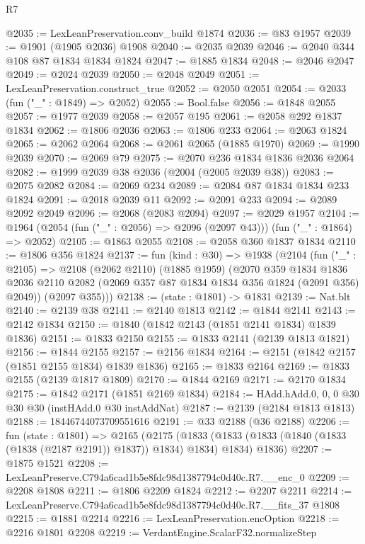 \begin{lexlean}{R7}
\begin{coremodule}
@2035 := LexLeanPreservation.conv_build @1874
@2036 := @83 @1957
@2039 := @1901 (@1905 @2036) @1908
@2040 := @2035 @2039
@2046 := @2040 @344 @108 @87 @1834 @1834 @1824
@2047 := @1885 @1834
@2048 := @2046 @2047
@2049 := @2024 @2039
@2050 := @2048 @2049
@2051 := LexLeanPreservation.construct_true
@2052 := @2050 @2051
@2054 := @2033 (fun ("_" : @1849) => @2052)
@2055 := Bool.false
@2056 := @1848 @2055
@2057 := @1977 @2039
@2058 := @2057 @195
@2061 := @2058 @292 @1837 @1834
@2062 := @1806 @2036
@2063 := @1806 @233
@2064 := @2063 @1824
@2065 := @2062 @2064
@2068 := @2061 @2065 (@1885 @1970)
@2069 := @1990 @2039
@2070 := @2069 @79
@2075 := @2070 @236 @1834 @1836 @2036 @2064
@2082 := @1999 @2039 @38 @2036 (@2004 (@2005 @2039 @38))
@2083 := @2075 @2082
@2084 := @2069 @234
@2089 := @2084 @87 @1834 @1834 @233 @1824
@2091 := @2018 @2039 @11
@2092 := @2091 @233
@2094 := @2089 @2092 @2049
@2096 := @2068 (@2083 @2094)
@2097 := @2029 @1957
@2104 := @1964 (@2054 (fun ("_" : @2056) => @2096 (@2097 @43))) (fun ("_" : @1864) => @2052)
@2105 := @1863 @2055
@2108 := @2058 @360 @1837 @1834
@2110 := @1806 @356 @1824
@2137 := fun (kind : @30) =>
  @1938
    (@2104
      (fun ("_" : @2105) =>
      @2108
        (@2062 @2110)
        (@1885 @1959)
        (@2070
          @359
          @1834
          @1836
          @2036
          @2110
          @2082
          (@2069 @357 @87 @1834 @1834 @356 @1824 (@2091 @356) @2049))
        (@2097 @355)))
@2138 := (state : @1801) -> @1831
@2139 := Nat.blt
@2140 := @2139 @38
@2141 := @2140 @1813
@2142 := @1844 @2141
@2143 := @2142 @1834
@2150 := @1840 (@1842 @2143 (@1851 @2141 @1834) @1839 @1836)
@2151 := @1833 @2150
@2155 := @1833 @2141 (@2139 @1813 @1821)
@2156 := @1844 @2155
@2157 := @2156 @1834
@2164 := @2151 (@1842 @2157 (@1851 @2155 @1834) @1839 @1836)
@2165 := @1833 @2164
@2169 := @1833 @2155 (@2139 @1817 @1809)
@2170 := @1844 @2169
@2171 := @2170 @1834
@2175 := @1842 @2171 (@1851 @2169 @1834)
@2184 := HAdd.hAdd.{0, 0, 0} @30 @30 @30 (instHAdd.{0} @30 instAddNat)
@2187 := @2139 (@2184 @1813 @1813)
@2188 := 18446744073709551616
@2191 := @33 @2188 (@36 @2188)
@2206 := fun (state : @1801) =>
  @2165
    (@2175
      (@1833 (@1833 (@1833 (@1840 (@1833 (@1838 (@2187 @2191)) @1837)) @1834) @1834) @1834)
      @1836)
@2207 := @1875 @1521
@2208 := LexLeanPreserve.C794a6cad1b5e8fdc98d1387794c0d40c.R7.__enc_0
@2209 := @2208 @1808
@2211 := @1806 @2209 @1824
@2212 := @2207 @2211
@2214 := LexLeanPreserve.C794a6cad1b5e8fdc98d1387794c0d40c.R7.__fits_37 @1808
@2215 := @1881 @2214
@2216 := LexLeanPreservation.encOption
@2218 := @2216 @1801 @2208
@2219 := VerdantEngine.ScalarF32.normalizeStep

\end{coremodule}
\end{lexlean}
